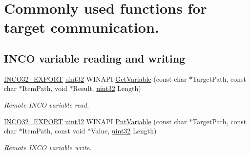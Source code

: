 \hypertarget{group__commonfunctions}{}\section{Commonly used functions for target communication.}
\label{group__commonfunctions}
\subsection*{I\+N\+CO variable reading and writing}
\begin{DoxyCompactItemize}
\item 
\hyperlink{inco__32_8h_a09505cad5bbb66fc36750a4fbca0444b}{I\+N\+C\+O32\+\_\+\+E\+X\+P\+O\+RT} \hyperlink{indeltypes_8h_a4b435a49c74bb91f284f075e63416cb6}{uint32} W\+I\+N\+A\+PI \hyperlink{group__commonfunctions_ga5a35fc7cdfb6037cb755ed8409a8f300}{Get\+Variable} (const char $\ast$Target\+Path, const char $\ast$Item\+Path, void $\ast$Result, \hyperlink{indeltypes_8h_a4b435a49c74bb91f284f075e63416cb6}{uint32} Length)
\begin{DoxyCompactList}\small\item\em Remote I\+N\+CO variable read. \end{DoxyCompactList}\item 
\hyperlink{inco__32_8h_a09505cad5bbb66fc36750a4fbca0444b}{I\+N\+C\+O32\+\_\+\+E\+X\+P\+O\+RT} \hyperlink{indeltypes_8h_a4b435a49c74bb91f284f075e63416cb6}{uint32} W\+I\+N\+A\+PI \hyperlink{group__commonfunctions_gac50fba25dcc47ea6f6f54c0141e34563}{Put\+Variable} (const char $\ast$Target\+Path, const char $\ast$Item\+Path, const void $\ast$Value, \hyperlink{indeltypes_8h_a4b435a49c74bb91f284f075e63416cb6}{uint32} Length)
\begin{DoxyCompactList}\small\item\em Remote I\+N\+CO variable write. \end{DoxyCompactList}\end{DoxyCompactItemize}
